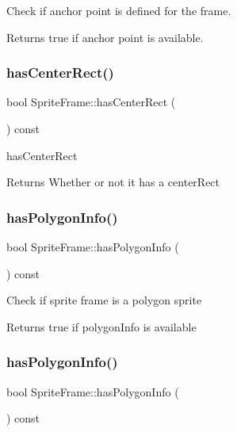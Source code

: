 Check if anchor point is defined for the frame.

\begin{DoxyReturn}{Returns}
true if anchor point is available. 
\end{DoxyReturn}
\mbox{\label{classSpriteFrame_ad40e09d55cdcb74feb1f8941642c08bf}} 
\subsubsection{\texorpdfstring{has\+Center\+Rect()}{hasCenterRect()}}
{\footnotesize\ttfamily bool Sprite\+Frame\+::has\+Center\+Rect (\begin{DoxyParamCaption}{ }\end{DoxyParamCaption}) const}

has\+Center\+Rect \begin{DoxyReturn}{Returns}
Whether or not it has a center\+Rect 
\end{DoxyReturn}
\mbox{\label{classSpriteFrame_aab1aa0e4f123b7b5be53bcc26edf1d26}} 
\subsubsection{\texorpdfstring{has\+Polygon\+Info()}{hasPolygonInfo()}\hspace{0.1cm}{\footnotesize\ttfamily [1/2]}}
{\footnotesize\ttfamily bool Sprite\+Frame\+::has\+Polygon\+Info (\begin{DoxyParamCaption}{ }\end{DoxyParamCaption}) const}

Check if sprite frame is a polygon sprite

\begin{DoxyReturn}{Returns}
true if polygon\+Info is available 
\end{DoxyReturn}
\mbox{\label{classSpriteFrame_aab1aa0e4f123b7b5be53bcc26edf1d26}} 
\subsubsection{\texorpdfstring{has\+Polygon\+Info()}{hasPolygonInfo()}\hspace{0.1cm}{\footnotesize\ttfamily [2/2]}}
{\footnotesize\ttfamily bool Sprite\+Frame\+::has\+Polygon\+Info (\begin{DoxyParamCaption}{ }\end{DoxyParamCaption}) const}

